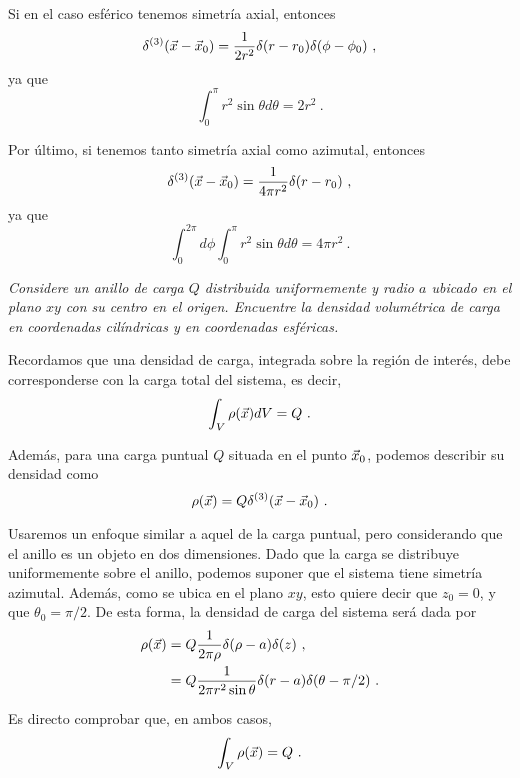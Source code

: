 Si en el caso esférico tenemos simetría axial, entonces
\begin{align*}
    \delta^{(3)}(\vec{x} - \vec{x}_0) = \frac{1}{2r^2} \delta(r - r_0) \delta(\phi - \phi_0) \ ,
\end{align*}
ya que
\begin{equation*}
    \int_0^\pi r^2 \sin \theta d\theta = 2r^2 \ .
\end{equation*}

Por último, si tenemos tanto simetría axial como azimutal, entonces
\begin{align*}
    \delta^{(3)}(\vec{x} - \vec{x}_0) = \frac{1}{4\pi r^2} \delta(r - r_0) \ ,
\end{align*}
ya que
\begin{equation*}
    \int_0^{2\pi} d\phi \int_0^\pi r^2 \sin \theta d\theta = 4\pi r^2 \ .
\end{equation*}

\begin{ejemplo}
    \emph{Considere un anillo de carga $Q$ distribuida uniformemente y radio $a$ ubicado en el plano $xy$ con su centro en el origen. Encuentre la densidad volumétrica de carga en coordenadas cilíndricas y en coordenadas esféricas.}

    Recordamos que una densidad de carga, integrada sobre la región de interés, debe corresponderse con la carga total del sistema, es decir,
    \begin{equation*}
        \int_V \rho(\vec{x}) dV = Q \ .
    \end{equation*}

    Además, para una carga puntual $Q$ situada en el punto $\vec{x}_0$, podemos describir su densidad como
    \begin{equation*}
        \rho(\vec{x}) = Q \delta^{(3)}(\vec{x}-\vec{x}_0) \ .
    \end{equation*}

    Usaremos un enfoque similar a aquel de la carga puntual, pero considerando que el anillo es un objeto en dos dimensiones. Dado que la carga se distribuye uniformemente sobre el anillo, podemos suponer que el sistema tiene simetría azimutal. Además, como se ubica en el plano $xy$, esto quiere decir que $z_0 = 0$, y que $\theta_0 = \pi/2$. De esta forma, la densidad de carga del sistema será dada por
    \begin{align*}
        \rho(\vec{x}) & = Q \frac{1}{2\pi \rho} \delta(\rho - a) \delta(z) \ , \\
        & = Q \frac{1}{2\pi r^2 \sin\theta} \delta(r-a) \delta(\theta - \pi/2) \ .
    \end{align*}
    
    Es directo comprobar que, en ambos casos,
    \begin{equation*}
        \int_V \rho(\vec{x}) = Q \ .
    \end{equation*}
\end{ejemplo}

